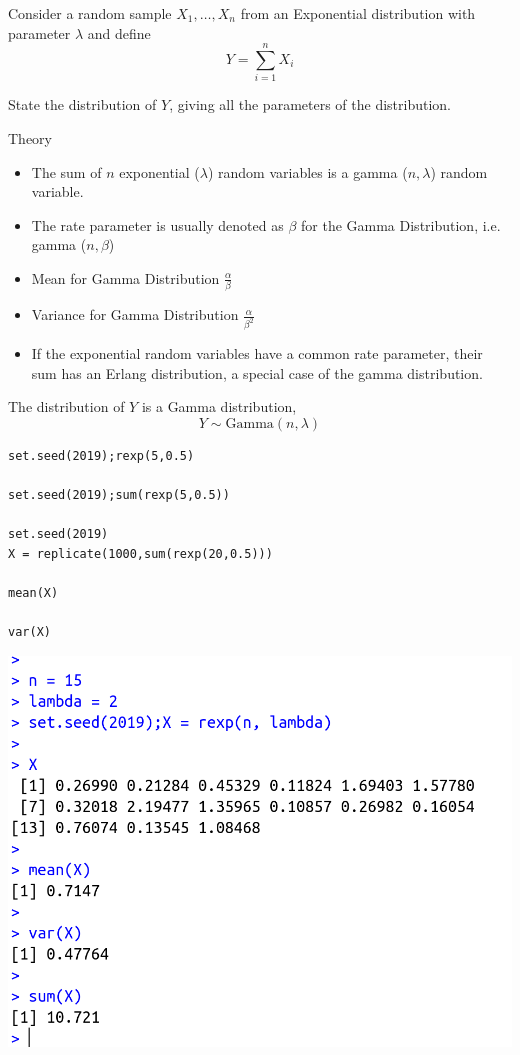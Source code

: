 \documentclass[a4paper,12pt]{article}
\begin{document}
\noindent Consider a random sample $X_1 , \ldots , X_n$ from an Exponential distribution with parameter $\lambda$ and define 
$$ Y = \sum^{n}_{i=1} X_i $$

\noindent State the distribution of $Y$, giving all the parameters of the distribution.


\begin{framed}
\large 
\noindent Theory
\begin{itemize}
    \item The sum of $n$ exponential ($\lambda$) random variables is a gamma ($n, \lambda$) random variable.
    \item The rate parameter is usually denoted as $\beta$ for the Gamma Distribution, i.e. gamma ($n, \beta$) 

 \item Mean for Gamma Distribution	 ${\displaystyle {\frac {\alpha }{\beta }}} $

\item Variance	for Gamma Distribution $ {\displaystyle {\frac {\alpha }{\beta ^{2}}}}$

    \item If the exponential random variables have a common rate parameter, their sum has an Erlang distribution, a special case of the gamma distribution.
\end{itemize}
\end{framed}

\noindent The distribution of $Y$ is a Gamma distribution,
$$Y \sim \mbox{Gamma}(n, \lambda)$$
\newpage 

\begin{framed}
\begin{verbatim}
set.seed(2019);rexp(5,0.5)

set.seed(2019);sum(rexp(5,0.5))

set.seed(2019)
X = replicate(1000,sum(rexp(20,0.5)))

mean(X)

var(X)

\end{verbatim}
\end{framed}

\newpage 
\includegraphics[scale=0.5]{00-C1/images/00-C1-Q3-2.png}
\newpage 
\end{document}
